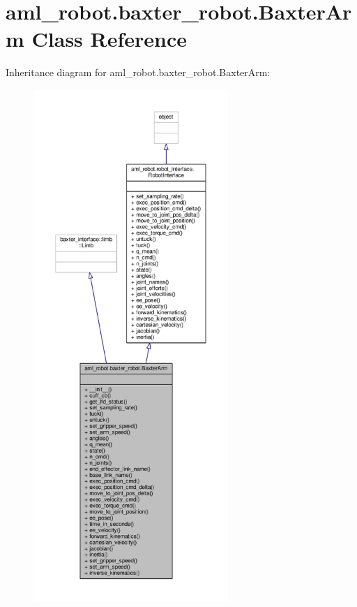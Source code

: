 \hypertarget{classaml__robot_1_1baxter__robot_1_1_baxter_arm}{\section{aml\-\_\-robot.\-baxter\-\_\-robot.\-Baxter\-Arm Class Reference}
\label{classaml__robot_1_1baxter__robot_1_1_baxter_arm}
}


Inheritance diagram for aml\-\_\-robot.\-baxter\-\_\-robot.\-Baxter\-Arm\-:
\nopagebreak
\begin{figure}[H]
\begin{center}
\leavevmode
\includegraphics[height=550pt]{classaml__robot_1_1baxter__robot_1_1_baxter_arm__inherit__graph}
\end{center}
\end{figure}


